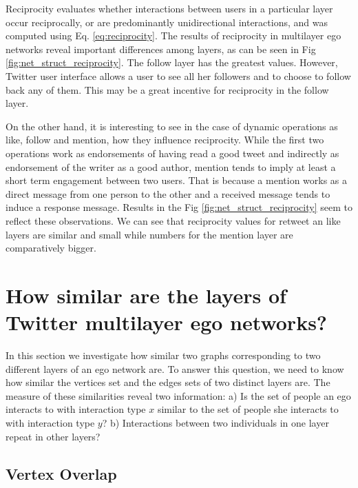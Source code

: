 Reciprocity evaluates whether interactions between users in a particular layer occur reciprocally, or are predominantly unidirectional interactions, and was computed using Eq. \ref{eq:reciprocity}. The results of reciprocity in multilayer ego networks reveal important differences among layers, as can be seen in Fig \ref{fig:net_struct_reciprocity}. The follow layer has the greatest values. However, Twitter user interface allows a user to see all her followers and to choose to follow back any of them. This may be a great incentive for reciprocity in the follow layer. 

On the other hand, it is interesting to see in the case of dynamic operations as like, follow and mention, how they influence reciprocity. While the first two operations work as endorsements of having read a good tweet and indirectly as endorsement of the writer as a good author, mention tends to imply at least a short term engagement between two users. That is because a mention works as a direct message from one person to the other and a received message tends to induce a response message. Results in the Fig \ref{fig:net_struct_reciprocity} seem to reflect these observations. We can see that reciprocity values for retweet an like layers are similar and small while numbers for the mention layer are comparatively bigger.


\section{How similar are the layers of Twitter multilayer ego networks?}
\label{sec:QuestionSimilarLayers}

In this section we investigate how similar two graphs corresponding to two different layers  of an ego network are. To answer this question, we need to know how similar the vertices set and the edges sets of two distinct layers are. The measure of these similarities reveal two information: a) Is the set of people an ego interacts to with interaction type $x$ similar to the set of people she interacts to with interaction type $y$? b) Interactions between two individuals in one layer repeat in other layers?

\subsection*{Vertex Overlap}
\label{subsec:vertex_overlap}

